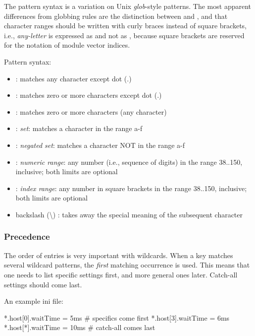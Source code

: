 The pattern syntax is a variation on Unix \textit{glob}-style
patterns. The most apparent differences from globbing rules are the
distinction between \ttt{*} and \ttt{**}, and that character ranges should
be written with curly braces instead of square brackets, i.e.,
\textit{any-letter} is expressed as  and not as
\ttt{[a-zA-Z]}, because square brackets are reserved for the notation of
module vector indices.

Pattern syntax:

\begin{itemize}
  \item {} : matches any character except dot (.)
  \item \ttt{*} : matches zero or more characters except dot (.)
  \item \ttt{**} : matches zero or more characters (any character)
  \item {} : \textit{set}: matches a character in the range a-f
  \item {}: \textit{negated set}: matches a character
    NOT in the range a-f
  \item {} : \textit{numeric range}: any number (i.e., sequence of digits)
    in the range 38..150, inclusive; both limits are optional
  \item \ttt{[38..150]} : \textit{index range}: any number in square brackets in the
    range 38..150, inclusive; both limits are optional
  \item backslash ({\textbackslash}) : takes away the special meaning of the
    subsequent character
\end{itemize}

\subsubsection{Precedence}
\label{sec:config-sim:precedence-of-entries}

The order of entries is very important with wildcards. When a key matches
several wildcard patterns, the \textit{first} matching occurrence
is used. This means that one needs to list specific settings first, and
more general ones later. Catch-all settings should come last.

An example ini file:

\begin{inifile}
[General]
*.host[0].waitTime = 5ms   # specifics come first
*.host[3].waitTime = 6ms
*.host[*].waitTime = 10ms  # catch-all comes last
\end{inifile}


